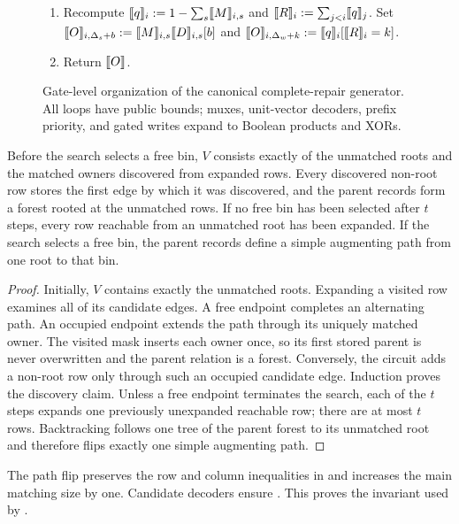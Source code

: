 \begin{figure}[H]
{\begin{minipage}{.95\textwidth}
\begin{enumerate}[nosep]
 \item Recompute $\share q_i:=1-\sum_s\share M_{i,s}$ and
 $\share R_i:=\sum_{j<i}\share q_j$.  Set
 $\share O_{i,\Delta_s+b}:=\share M_{i,s}\share D_{i,s}[b]$ and
 $\share O_{i,\Delta_w+k}:=\share q_i[\share R_i=k]$.

 \item Return $\share O$.
\end{enumerate}
\end{minipage}}
\caption{Gate-level organization of the canonical complete-repair generator.
All loops have public bounds; muxes, unit-vector decoders, prefix priority, and
gated writes expand to Boolean products and XORs.
\label{fig:waterfallReachabilityProtocol}}
\end{figure}

\begin{lemma}
\label{lem:waterfall-reachability-round}
Before the search selects a free bin, $V$ consists exactly of the unmatched
roots and the matched owners discovered from expanded rows.  Every discovered
non-root row stores the first edge by which it was discovered, and the parent
records form a forest rooted at the unmatched rows.  If no free bin has been
selected after $t$ steps, every row reachable from an unmatched root has been
expanded.  If the search selects a free bin, the parent records define a
simple augmenting path from one root to that bin.
\end{lemma}

\begin{proof}
Initially, $V$ contains exactly the unmatched roots.  Expanding a visited row
examines all of its candidate edges.  A free endpoint completes an alternating
path.  An occupied endpoint extends the path through its uniquely matched
owner.  The visited mask inserts each owner once, so its first stored parent is
never overwritten and the parent relation is a forest.  Conversely, the
circuit adds a non-root row only through such an occupied candidate edge.
Induction proves the discovery claim.  Unless a free endpoint terminates the
search, each of the $t$ steps expands one previously unexpanded reachable row;
there are at most $t$ rows.  Backtracking follows one tree of the parent forest
to its unmatched root and therefore flips exactly one simple augmenting path.
\end{proof}

The path flip preserves the row and column inequalities in
 and increases the main
matching size by one.  Candidate decoders ensure
.  This proves the invariant
used by .

